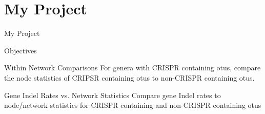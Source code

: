 \documentclass[dvipsnames]{beamer}
\begin{document}
\section{My Project}
\begin{frame}{}%
    \begin{center}
        \Huge \textcolor{OliveGreen}{My Project}
    \end{center}
    \addtocounter{framenumber}{-1}
\end{frame}
\begin{frame}[fragile]{Objectives}
     \begin{block}{Within Network Comparisons}
        For genera with CRISPR containing \ac{otu}s, compare the node statistics of CRIPSR containing \ac{otu}s to non-CRISPR containing \ac{otu}s.
    \end{block}
     \begin{block}{Gene Indel Rates vs. Network Statistics}
        Compare gene Indel rates to node/network statistics for CRISPR containing and non-CRISPR containing \ac{otu}s
    \end{block}
\end{frame}
\end{document}
